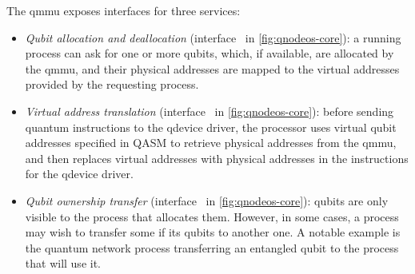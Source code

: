 The \acrshort{qmmu} exposes interfaces for three services:
\begin{itemize}
    \item \emph{Qubit allocation and deallocation} (interface~ in
          \cref{fig:qnodeos-core}): a running process can ask for one or more qubits, which, if
          available, are allocated by the \acrshort{qmmu}, and their physical addresses are mapped
          to the virtual addresses provided by the requesting process.
    \item \emph{Virtual address translation} (interface~ in \cref{fig:qnodeos-core}):
          before sending quantum instructions to the \acrshort{qdevice} driver, the processor uses
          virtual qubit addresses specified in QASM to retrieve physical addresses from the
          \acrshort{qmmu}, and then replaces virtual addresses with physical addresses in the
          instructions for the \acrshort{qdevice} driver.
    \item \emph{Qubit ownership transfer} (interface~ in \cref{fig:qnodeos-core}):
          qubits are only visible to the process that allocates them. However, in some cases, a
          process may wish to transfer some if its qubits to another one. A notable example is the
          quantum network process transferring an entangled qubit to the process that will use it.
\end{itemize}

\printbibliography[heading=subbibintoc,title={References}]
